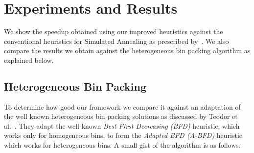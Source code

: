 \documentclass[10pt, conference, compsocconf]{IEEEtran}
\begin{document}








\section{Experiments and Results}
We show the speedup obtained using our improved heuristics against the conventional
heuristics for Simulated Annealing as prescribed by~\cite{heikki}. We also
compare the results we obtain against the heterogeneous bin packing algorithm as
explained below. 

\subsection{Heterogeneous Bin Packing}

To determine how good our framework we compare it against an adaptation of the
well known heterogeneous bin packing solutions as discussed by Teodor et
al.~\cite{CIRRLET}. They adapt the well-known \textit{Best First Decreasing
(BFD)} heuristic, which works only for homogeneous bins, to form the
\textit{Adapted BFD (A-BFD)} heuristic which works for heterogeneous bins. A
small gist of the algorithm is as follows.
\end{document}
